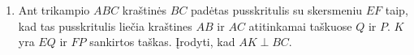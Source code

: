\begin{enumerate}
\item Ant trikampio $ABC$ kraštinės $BC$ padėtas
  pusskritulis su skersmeniu $EF$ taip, kad tas pusskritulis
  liečia kraštines $AB$ ir $AC$ atitinkamai taškuose $Q$ ir
  $P$. $K$ yra $EQ$ ir $FP$ sankirtos taškas. Įrodyti, kad
  $AK\perp{BC}$.

\end{enumerate}
